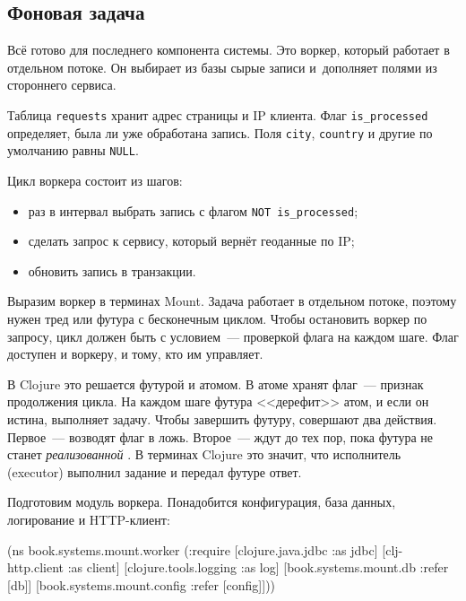 \subsection{Фоновая задача}

\label{worker}

Всё готово для последнего компонента системы. Это воркер, который работает в
отдельном потоке. Он выбирает из базы сырые записи и~дополняет полями из
стороннего сервиса.

Таблица \verb|requests| хранит адрес страницы и IP клиента. Флаг
\verb|is_processed| определяет, была ли уже обработана запись. Поля \verb|city|,
\verb|country| и другие по умолчанию равны \verb|NULL|.


Цикл воркера состоит из шагов:

\begin{itemize}

\item
  раз в интервал выбрать запись с флагом \verb|NOT is_processed|;

\item
  сделать запрос к сервису, который вернёт геоданные по IP;

\item
  обновить запись в транзакции.

\end{itemize}

Выразим воркер в терминах Mount. Задача работает в отдельном потоке, поэтому
нужен тред или футура с бесконечным циклом. Чтобы остановить воркер по запросу,
цикл должен быть с условием~--- проверкой флага на каждом шаге. Флаг доступен и
воркеру, и тому, кто им управляет.


В Clojure это решается футурой и атомом. В атоме хранят флаг~--- признак
продолжения цикла. На каждом шаге футура <<дерефит>> атом, и если он истина,
выполняет задачу. Чтобы завершить футуру, совершают два действия. Первое~---
возводят флаг в ложь. Второе~--- ждут до тех пор, пока футура не станет
\emph{реализованной} . В терминах Clojure это значит, что
исполнитель (executor) выполнил задание и передал футуре ответ.

Подготовим модуль воркера. Понадобится конфигурация, база данных, логирование и
HTTP-клиент:

\begin{english}
  \begin{clojure}
(ns book.systems.mount.worker
  (:require
   [clojure.java.jdbc :as jdbc]
   [clj-http.client :as client]
   [clojure.tools.logging :as log]
   [book.systems.mount.db :refer [db]]
   [book.systems.mount.config :refer [config]]))
  \end{clojure}
\end{english}

